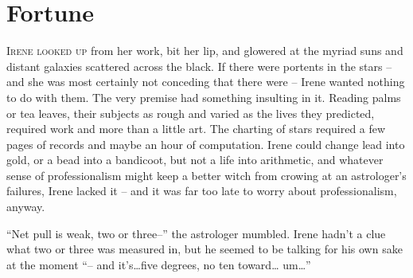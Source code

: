 \documentclass[../FGP.tex]{subfiles}
\def\setmarginpargeometry{%
  \newgeometry{textwidth=260pt,marginparwidth=150pt}
  \edef\marginnotetextwidth{\the\textwidth}}
\begin{document}
\setmarginpargeometry
\section{Fortune}

\noindent \label{sec:fortune}\lettrine[lines=3,loversize=0.039]{I}{rene looked up}%
from her work, bit her lip, and glowered at the myriad suns and distant galaxies scattered across the black. If there were portents in the stars -- and she was most certainly not conceding that there were -- Irene wanted nothing to do with them. The very premise had something insulting in it. Reading palms or tea leaves, their subjects as rough and varied as the lives they predicted, required work and more than a little art. The charting of stars required a few pages of records and maybe an hour of computation. Irene could change lead into gold, or a bead into a bandicoot, but not a life into arithmetic, and whatever sense of professionalism might keep a better witch from crowing at an astrologer's failures, Irene lacked it -- and it was far too late to worry about professionalism, anyway.

``Net pull is weak, two or three--'' the astrologer mumbled. Irene hadn't a clue what two or three was measured in, but he seemed to be talking for his own sake at the moment ``-- and it's\ldots five degrees, no ten toward{\ldots} um{\ldots}''
\end{document}
